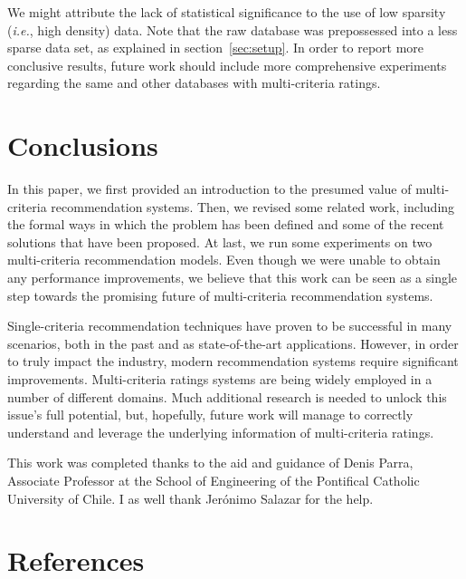 \documentclass[sigconf,authordraft]{acmart}
\begin{document}
We might attribute the lack of statistical significance to the use of low sparsity (\textit{i.e.}, high density) data. Note that the raw database was prepossessed into a less sparse data set, as explained in section~\ref{sec:setup}. In order to report more conclusive results, future work should include more comprehensive experiments regarding the same and other databases with multi-criteria ratings.

\section{Conclusions}

In this paper, we first provided an introduction to the presumed value of multi-criteria recommendation systems. Then, we revised some related work, including the formal ways in which the problem has been defined and some of the recent solutions that have been proposed. At last, we run some experiments on two multi-criteria recommendation models. Even though we were unable to obtain any performance improvements, we believe that this work can be seen as a single step towards the promising future of multi-criteria recommendation systems. 

Single-criteria recommendation techniques have proven to be successful in many scenarios, both in the past and as state-of-the-art applications. However, in order to truly impact the industry, modern recommendation systems require significant improvements. Multi-criteria ratings systems are being widely employed in a number of different domains. Much additional research is needed to unlock this issue's full potential, but, hopefully, future work will manage to correctly understand and leverage the underlying information of multi-criteria ratings.

\begin{acks}
This work was completed thanks to the aid and guidance of Denis Parra, Associate Professor at the School of Engineering of the Pontifical Catholic University of Chile. I as well thank Jerónimo Salazar for the help.
\end{acks}

\section*{References}

\footnotesize
\end{document}
